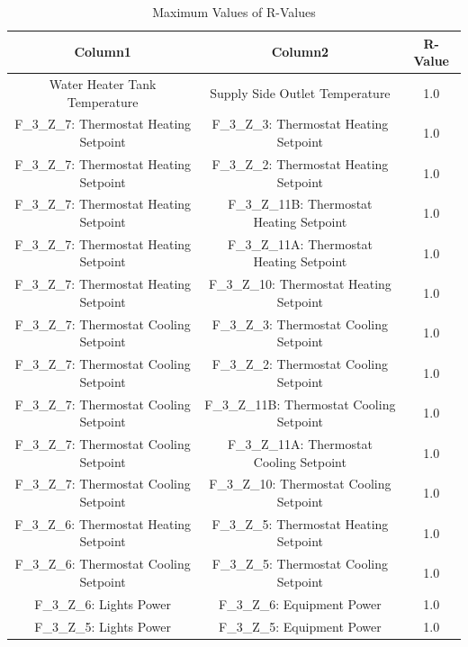 \documentclass[aps, 10pt, a4paper]{article}
\begin{document}
                \begin{table}[htbp]
                    \centering
                    \caption{Maximum Values of R-Values}
                    \label{tb:rmax}
                    \begin{tabular}{c|c||c}
                        Column1 & Column2 & R-Value \\ \hline
                        Water Heater Tank Temperature & Supply Side Outlet Temperature & 1.0 \\
                        F\_3\_Z\_7: Thermostat Heating Setpoint & F\_3\_Z\_3: Thermostat Heating Setpoint & 1.0 \\
                        F\_3\_Z\_7: Thermostat Heating Setpoint & F\_3\_Z\_2: Thermostat Heating Setpoint & 1.0 \\
                        F\_3\_Z\_7: Thermostat Heating Setpoint & F\_3\_Z\_11B: Thermostat Heating Setpoint & 1.0 \\
                        F\_3\_Z\_7: Thermostat Heating Setpoint & F\_3\_Z\_11A: Thermostat Heating Setpoint & 1.0 \\
                        F\_3\_Z\_7: Thermostat Heating Setpoint & F\_3\_Z\_10: Thermostat Heating Setpoint & 1.0 \\
                        F\_3\_Z\_7: Thermostat Cooling Setpoint & F\_3\_Z\_3: Thermostat Cooling Setpoint & 1.0 \\
                        F\_3\_Z\_7: Thermostat Cooling Setpoint & F\_3\_Z\_2: Thermostat Cooling Setpoint & 1.0 \\
                        F\_3\_Z\_7: Thermostat Cooling Setpoint & F\_3\_Z\_11B: Thermostat Cooling Setpoint & 1.0 \\
                        F\_3\_Z\_7: Thermostat Cooling Setpoint & F\_3\_Z\_11A: Thermostat Cooling Setpoint & 1.0 \\
                        F\_3\_Z\_7: Thermostat Cooling Setpoint & F\_3\_Z\_10: Thermostat Cooling Setpoint & 1.0 \\
                        F\_3\_Z\_6: Thermostat Heating Setpoint & F\_3\_Z\_5: Thermostat Heating Setpoint & 1.0 \\
                        F\_3\_Z\_6: Thermostat Cooling Setpoint & F\_3\_Z\_5: Thermostat Cooling Setpoint & 1.0 \\
                        F\_3\_Z\_6: Lights Power & F\_3\_Z\_6: Equipment Power & 1.0 \\
                        F\_3\_Z\_5: Lights Power & F\_3\_Z\_5: Equipment Power & 1.0 \\

\end{tabular}
\end{table}
\end{document}
